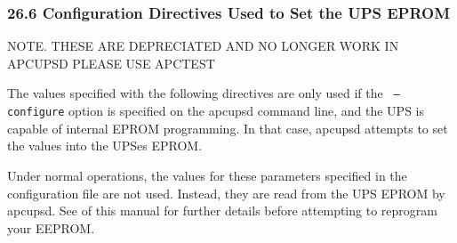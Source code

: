 \label{Configuration-Directives-Used-to-Set-the-UPS-EPROM}

\subsubsection*{26.6 Configuration Directives Used to Set the UPS EPROM}

\label{index-Directives-EEPROM-248}
\label{index-EEPROM-directives-249}
NOTE. THESE ARE DEPRECIATED AND NO LONGER WORK IN APCUPSD PLEASE USE APCTEST  

The values specified with the following directives are only used if the {\tt
--configure} option is specified on the apcupsd command line, and the UPS is
capable of internal EPROM programming.  In that case, apcupsd attempts to set
the values into the UPSes EPROM.  

Under normal operations, the values for these parameters specified in the
configuration file are not used. Instead, they are read from the UPS EPROM by
apcupsd.  See 
 of this
manual for further details before attempting to reprogram your EEPROM.  

